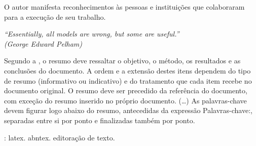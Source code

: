 \documentclass[
	12pt,				%
	openright,			%
	oneside,			%
	a4paper,			%
	sumario=tradicional,%
	brazil,			%
	french,				%
	spanish,			%
	english				%
	]{abntex2}
\theoremstyle{plain}
\theoremstyle{definition}
\begin{document}
\begin{agradecimentos}
O autor manifesta reconhecimentos às pessoas e instituições que colaboraram para a execução de seu trabalho.

\end{agradecimentos}

\begin{epigrafe}
    \vspace*{\fill}
	\begin{flushright}
		\textit{``Essentially, all models are wrong, but some are useful.''\\
		(George Edward Pelham)}
	\end{flushright}
\end{epigrafe}


\setlength{\absparsep}{18pt} %
\begin{resumo}
 Segundo a , o resumo deve ressaltar o
 objetivo, o método, os resultados e as conclusões do documento. A ordem e a extensão
 destes itens dependem do tipo de resumo (informativo ou indicativo) e do
 tratamento que cada item recebe no documento original. O resumo deve ser
 precedido da referência do documento, com exceção do resumo inserido no
 próprio documento. (\ldots) As palavras-chave devem figurar logo abaixo do
 resumo, antecedidas da expressão Palavras-chave:, separadas entre si por
 ponto e finalizadas também por ponto.

 \textbf{\palavrasChave}: latex. abntex. editoração de texto.
\end{resumo}
\end{document}
